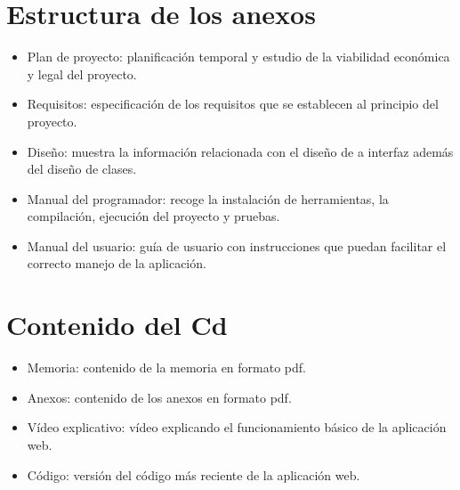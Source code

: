 \section{Estructura de los anexos}
\begin{itemize}
	\item Plan de proyecto: planificación temporal y estudio de la viabilidad económica y legal del proyecto.
	\item Requisitos: especificación de los requisitos que se establecen al principio del proyecto.
	\item Diseño: muestra la información relacionada con el diseño de a interfaz además del diseño de clases.
	\item Manual del programador: recoge la instalación de herramientas, la compilación, ejecución del proyecto y pruebas.
	\item Manual del usuario: guía de usuario con instrucciones que puedan facilitar el correcto manejo de la aplicación.
\end{itemize}

\section{Contenido del Cd}
\begin{itemize}
	\item Memoria: contenido de la memoria en formato pdf.
	\item Anexos: contenido de los anexos en formato pdf.
	\item Vídeo explicativo: vídeo explicando el funcionamiento básico de la aplicación web.
	\item Código: versión del código más reciente de la aplicación web.  	
\end{itemize}